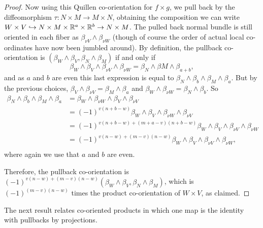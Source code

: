 \begin{proof}
Now using this Quillen co-orientation for $f\times g$,  we pull back by the diffeomorphism $\tau:N\times M\to M\times N$,  obtaining the composition we can write $W\times V\hookrightarrow N\times M\times \mathbb{R}^a\times \mathbb{R}^b\to N\times M$. The pulled back normal bundle is still oriented in each fiber as $\beta_{\nu V}\wedge \beta_{\nu W}$ (though of course the order of actual local co-ordinates have now been jumbled around). By definition, the pullback co-orientation is $(\beta_W\wedge \beta_V,\beta_N\wedge \beta_M)$ if and only if $$\beta_W\wedge \beta_V\wedge \beta_{\nu V}\wedge \beta_{\nu W}=\beta_N\wedge \beta M\wedge \beta_{a+b},$$
and as $a$ and $b$ are even this last expression is equal to 
$\beta_N\wedge \beta_b\wedge \beta_M\wedge \beta_{a}.$ But by the previous choices, $\beta_V\wedge \beta_{\nu V}=\beta_M\wedge \beta_a$ and  $\beta_W\wedge \beta_{\nu W}=\beta_N\wedge \beta_b$. So 
\begin{align*}
\beta_N\wedge \beta_b\wedge \beta_M\wedge \beta_{a}&=\beta_W\wedge \beta_{\nu W}\wedge  \beta_V\wedge \beta_{\nu V}\\
&=(-1)^{v(n+b-w)}\beta_W\wedge  \beta_V\wedge \beta_{\nu W}\wedge \beta_{\nu V}\\
&=(-1)^{v(n+b-w)+(m+a-v)(n+b-w)}\beta_W\wedge  \beta_V\wedge \beta_{\nu V}\wedge \beta_{\nu W}\\
&=(-1)^{v(n-w)+(m-v)(n-w)}\beta_W\wedge  \beta_V\wedge \beta_{\nu V}\wedge \beta_{\nu W},\\
\end{align*}
where again we use that $a$ and $b$ are even. 

Therefore, the pullback co-orientation is $(-1)^{v(n-w)+(m-v)(n-w)}(\beta_W\wedge \beta_V,\beta_N \wedge \beta_M)$, which is $(-1)^{(m-v)(n-w)}$ times the product co-orientation of $W\times V$, as claimed.
\end{proof}


The next result relates co-oriented products in which one map is the identity with pullbacks by projections. 

